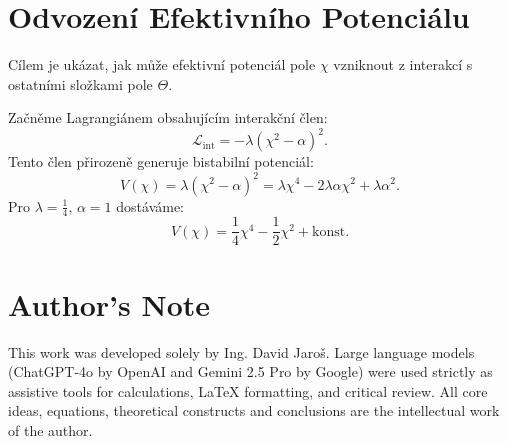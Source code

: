 \documentclass{article}
\begin{document}
\section*{Odvození Efektivního Potenciálu}

Cílem je ukázat, jak může efektivní potenciál pole $\chi$ vzniknout z interakcí s ostatními složkami pole $\Theta$.

Začněme Lagrangiánem obsahujícím interakční člen:
\[
\mathcal{L}_{\text{int}} = -\lambda (\chi^2 - \alpha)^2.
\]
Tento člen přirozeně generuje bistabilní potenciál:
\[
V(\chi) = \lambda (\chi^2 - \alpha)^2 = \lambda \chi^4 - 2\lambda \alpha \chi^2 + \lambda \alpha^2.
\]
Pro $\lambda = \frac{1}{4}$, $\alpha = 1$ dostáváme:
\[
V(\chi) = \frac{1}{4} \chi^4 - \frac{1}{2} \chi^2 + \text{konst.}
\]


\section*{Author's Note}

This work was developed solely by Ing. David Jaroš.  
Large language models (ChatGPT-4o by OpenAI and Gemini 2.5 Pro by Google) were used strictly as assistive tools for calculations, LaTeX formatting, and critical review.  
All core ideas, equations, theoretical constructs and conclusions are the intellectual work of the author.
\end{document}
